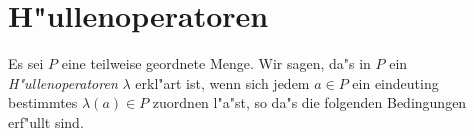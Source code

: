 \documentclass{article}
\begin{document}
\section{H"ullenoperatoren}
Es sei $P$ eine teilweise geordnete Menge. Wir sagen, da"s in $P$ ein
\emph{H"ullenoperatoren} $\lambda$ erkl"art ist, wenn sich jedem $a \in
P $ ein eindeuting bestimmtes $\lambda(a) \in P  $ zuordnen l"a"st, so
da"s die folgenden Bedingungen erf"ullt sind.
\end{document}

